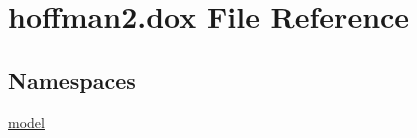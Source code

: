 \hypertarget{hoffman2_8dox}{}\section{hoffman2.\+dox File Reference}
\label{hoffman2_8dox}
\subsection*{Namespaces}
\begin{DoxyCompactItemize}
\item 
 \hyperlink{namespacemodel}{model}
\end{DoxyCompactItemize}
